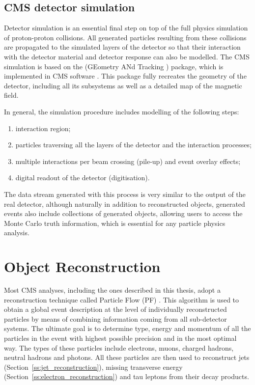 \subsection{CMS detector simulation}
\label{ss:detector_simulation}

Detector simulation is an essential final step on top of the full physics simulation of proton-proton collisions. All
generated particles resulting from these collisions are propagated to the simulated layers of the detector so that their
interaction with the detector material and detector response can also be modelled. The CMS simulation is based on the
\GEANTfour (GEometry ANd Tracking \autocite{GEANT4}) package, which is implemented in CMS software \CMSSW
\autocite{CMSSW}. This package fully recreates the geometry of the detector, including all its subsystems as well as a
detailed map of the magnetic field.

In general, the simulation procedure includes modelling of the following steps:
\begin{enumerate}[label=\textbullet]
  \item interaction region;
  \item particles traversing all the layers of the detector and the interaction processes;
  \item multiple interactions per beam crossing (pile-up) and event overlay effects;
  \item digital readout of the detector (digitisation).
\end{enumerate}

The data stream generated with this process is very similar to the output of the real detector, although naturally in
addition to reconstructed objects, generated events also include collections of generated objects, allowing users to
access the Monte Carlo truth information, which is essential for any particle physics analysis.

\newpage
\section{Object Reconstruction}
\label{s:object_reconstruction}
Most CMS analyses, including the ones described in this thesis, adopt a reconstruction technique called Particle Flow
(PF) \autocite{PF}. This algorithm is used to obtain a global event description at the level of individually
reconstructed particles by means of combining information coming from all sub-detector systems. The ultimate goal is to
determine type, energy and momentum of all the particles in the event with highest possible precision and in the most
optimal way. The types of these particles include electrons, muons, charged hadrons, neutral hadrons and photons. All
these particles are then used to reconstruct jets (Section~\ref{ss:jet_reconstruction}), missing transverse energy
(Section~\ref{ss:electron_reconstruction}) and tau leptons from their decay products.

